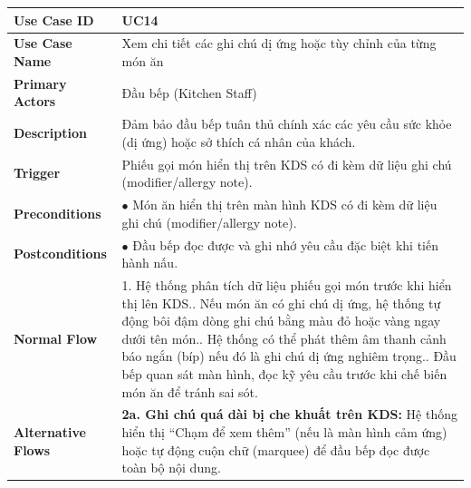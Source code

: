 \begin{longtable}{|p{3.5cm}|p{12.5cm}|}
\hline
\textbf{Use Case ID} & UC14 \\ \hline
\textbf{Use Case Name} & Xem chi tiết các ghi chú dị ứng hoặc tùy chỉnh của từng món ăn \\ \hline
\textbf{Primary Actors} & Đầu bếp (Kitchen Staff) \\ \hline
\textbf{Description} & Đảm bảo đầu bếp tuân thủ chính xác các yêu cầu sức khỏe (dị ứng) hoặc sở thích cá nhân của khách. \\ \hline
\textbf{Trigger} & Phiếu gọi món hiển thị trên KDS có đi kèm dữ liệu ghi chú (modifier/allergy note). \\ \hline
\textbf{Preconditions} & $\bullet$ Món ăn hiển thị trên màn hình KDS có đi kèm dữ liệu ghi chú (modifier/allergy note). \\ \hline
\textbf{Postconditions} & $\bullet$ Đầu bếp đọc được và ghi nhớ yêu cầu đặc biệt khi tiến hành nấu. \\ \hline
\textbf{Normal Flow} &
1. Hệ thống phân tích dữ liệu phiếu gọi món trước khi hiển thị lên KDS.\newline
2. Nếu món ăn có ghi chú dị ứng, hệ thống tự động bôi đậm dòng ghi chú bằng màu đỏ hoặc vàng ngay dưới tên món.\newline
3. Hệ thống có thể phát thêm âm thanh cảnh báo ngắn (bíp) nếu đó là ghi chú dị ứng nghiêm trọng.\newline
4. Đầu bếp quan sát màn hình, đọc kỹ yêu cầu trước khi chế biến món ăn để tránh sai sót. \\ \hline
\textbf{Alternative Flows} &
\textbf{2a. Ghi chú quá dài bị che khuất trên KDS:} Hệ thống hiển thị ``Chạm để xem thêm'' (nếu là màn hình cảm ứng) hoặc tự động cuộn chữ (marquee) để đầu bếp đọc được toàn bộ nội dung. \\ \hline
\end{longtable}

